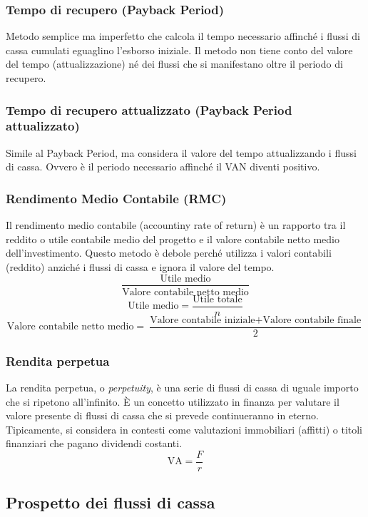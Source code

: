 \documentclass[a4paper,10pt]{article}
\begin{document}
\subsubsection{Tempo di recupero (Payback Period)}
Metodo semplice ma imperfetto che calcola il tempo necessario affinché i flussi di cassa cumulati eguaglino l'esborso iniziale. Il metodo non tiene conto del valore del tempo (attualizzazione) né dei flussi che si manifestano oltre il periodo di recupero.

\subsubsection{Tempo di recupero attualizzato (Payback Period attualizzato)}
Simile al Payback Period, ma considera il valore del tempo attualizzando i flussi di cassa. Ovvero è il periodo necessario affinché il VAN diventi positivo.

\subsubsection{Rendimento Medio Contabile (RMC)}
Il rendimento medio contabile (accountiny rate of return) è un rapporto tra il reddito o utile contabile medio del progetto e il valore contabile netto medio dell'investimento. Questo metodo è debole perché utilizza i valori contabili (reddito) anziché i flussi di cassa e ignora il valore del tempo.
\[ \frac{\text{Utile medio}}{\text{Valore contabile netto medio}} \]
\[\text{Utile medio} = \frac{\text{Utile totale}}{n} \]
\[\text{Valore contabile netto medio} = \frac{\text{Valore contabile iniziale} + \text{Valore contabile finale}}{2} \]

\subsubsection{Rendita perpetua}La rendita perpetua, o \textit{perpetuity}, è una serie di flussi di cassa di uguale importo che si ripetono all'infinito. È un concetto utilizzato in finanza per valutare il valore presente di flussi di cassa che si prevede continueranno in eterno. Tipicamente, si considera in contesti come valutazioni immobiliari (affitti) o titoli finanziari che pagano dividendi costanti.
\[\text{VA} = \frac{F}{r}\]






\subsection{Prospetto dei flussi di cassa}
\end{document}
